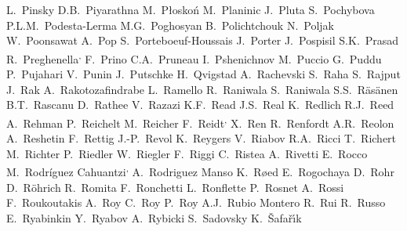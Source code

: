 \begin{flushleft}
L.~Pinsky\And
D.B.~Piyarathna\And
M.~P\l osko\'{n}\And
M.~Planinic\And
J.~Pluta\And
S.~Pochybova\And
P.L.M.~Podesta-Lerma\And
M.G.~Poghosyan\And
B.~Polichtchouk\And
N.~Poljak\And
W.~Poonsawat\And
A.~Pop\And
S.~Porteboeuf-Houssais\And
J.~Porter\And
J.~Pospisil\And
S.K.~Prasad\And
R.~Preghenella\textsuperscript{,}\And
F.~Prino\And
C.A.~Pruneau\And
I.~Pshenichnov\And
M.~Puccio\And
G.~Puddu\And
P.~Pujahari\And
V.~Punin\And
J.~Putschke\And
H.~Qvigstad\And
A.~Rachevski\And
S.~Raha\And
S.~Rajput\And
J.~Rak\And
A.~Rakotozafindrabe\And
L.~Ramello\And
R.~Raniwala\And
S.~Raniwala\And
S.S.~R\"{a}s\"{a}nen\And
B.T.~Rascanu\And
D.~Rathee\And
V.~Razazi\And
K.F.~Read\And
J.S.~Real\And
K.~Redlich\And
R.J.~Reed\And
A.~Rehman\And
P.~Reichelt\And
M.~Reicher\And
F.~Reidt\textsuperscript{,}\And
X.~Ren\And
R.~Renfordt\And
A.R.~Reolon\And
A.~Reshetin\And
F.~Rettig\And
J.-P.~Revol\And
K.~Reygers\And
V.~Riabov\And
R.A.~Ricci\And
T.~Richert\And
M.~Richter\And
P.~Riedler\And
W.~Riegler\And
F.~Riggi\And
C.~Ristea\And
A.~Rivetti\And
E.~Rocco\And
M.~Rodr\'{i}guez Cahuantzi\textsuperscript{,}\And
A.~Rodriguez Manso\And
K.~R{\o}ed\And
E.~Rogochaya\And
D.~Rohr\And
D.~R\"ohrich\And
R.~Romita\And
F.~Ronchetti\And
L.~Ronflette\And
P.~Rosnet\And
A.~Rossi\And
F.~Roukoutakis\And
A.~Roy\And
C.~Roy\And
P.~Roy\And
A.J.~Rubio Montero\And
R.~Rui\And
R.~Russo\And
E.~Ryabinkin\And
Y.~Ryabov\And
A.~Rybicki\And
S.~Sadovsky\And
K.~\v{S}afa\v{r}\'{\i}k\And

\end{flushleft}
